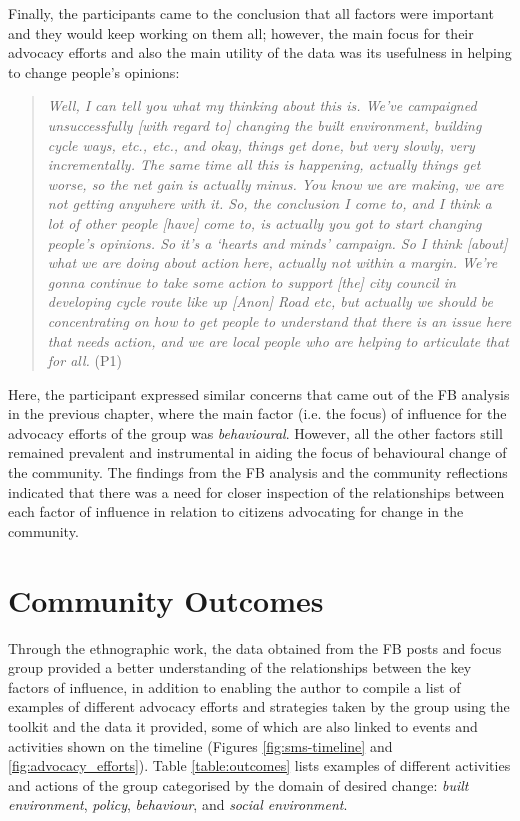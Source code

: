 Finally, the participants came to the conclusion that all factors were important and they would keep working on them all; however, the main focus for their advocacy efforts and also the main utility of the data was its usefulness in helping to change people's opinions:
\begin{quote}
    \textit{Well, I can tell you what my thinking about this is. We've campaigned unsuccessfully [with regard to] changing the built environment, building cycle ways, etc., etc., and okay, things get done, but very slowly, very incrementally. The same time all this is happening, actually things get worse, so the net gain is actually minus. You know we are making, we are not getting anywhere with it. So, the conclusion I come to, and I think a lot of other people [have] come to, is actually you got to start changing people's opinions. So it's a `hearts and minds' campaign. So I think [about] what we are doing about action here, actually not within a margin. We're gonna continue to take some action to support [the] city council in developing cycle route like up [Anon] Road etc, but actually we should be concentrating on how to get people to understand that there is an issue here that needs action, and we are local people who are helping to articulate that for all.} (P1)
\end{quote}

Here, the participant expressed similar concerns that came out of the FB analysis in the previous chapter, where the main factor (i.e. the focus) of influence for the advocacy efforts of the group was \textit{behavioural}. However, all the other factors still remained prevalent and instrumental in aiding the focus of behavioural change of the community. The findings from the FB analysis and the community reflections indicated that there was a need for closer inspection of the relationships between each factor of influence in relation to citizens advocating for change in the community.

\section{Community Outcomes}

Through the ethnographic work, the data obtained from the FB posts and focus group provided a better understanding of the relationships between the key factors of influence, in addition to enabling the author to compile a list of examples of different advocacy efforts and strategies taken by the group using the toolkit and the data it provided, some of which are also linked to events and activities shown on the timeline (Figures \ref{fig:sms-timeline} and \ref{fig:advocacy_efforts}). Table \ref{table:outcomes} lists examples of different activities and actions of the group categorised by the domain of desired change: \textit{built environment}, \textit{policy}, \textit{behaviour}, and \textit{social environment}. 


